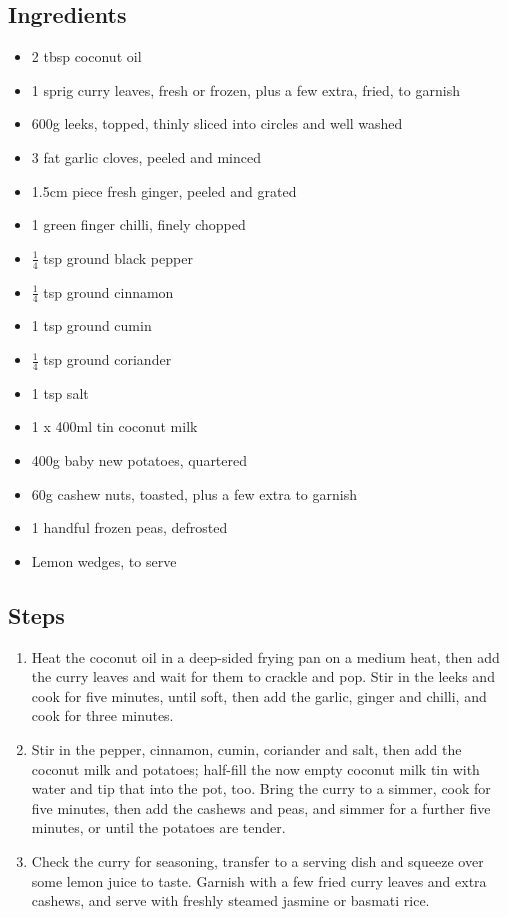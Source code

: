 \documentclass{book}
\begin{document}
\subsection*{Ingredients}
\begin{itemize}
\item 2 tbsp coconut oil
\item 1 sprig curry leaves, fresh or frozen, plus a few extra, fried, to garnish 
\item 600g leeks, topped, thinly sliced into circles and well washed
\item 3 fat garlic cloves, peeled and minced
\item 1.5cm piece fresh ginger, peeled and grated
\item 1 green finger chilli, finely chopped
\item $\frac{1}{4}$ tsp ground black pepper
\item $\frac{1}{4}$ tsp ground cinnamon
\item 1 tsp ground cumin
\item $\frac{1}{4}$ tsp ground coriander
\item 1 tsp salt
\item 1 x 400ml tin coconut milk
\item 400g baby new potatoes, quartered
\item 60g cashew nuts, toasted, plus a few extra to garnish
\item 1 handful frozen peas, defrosted
\item Lemon wedges, to serve
\end{itemize}

\subsection*{Steps}
\begin{enumerate}
\item Heat the coconut oil in a deep-sided frying pan on a medium heat, then add the curry leaves and wait for them to crackle and pop. Stir in the leeks and cook for five minutes, until soft, then add the garlic, ginger and chilli, and cook for three minutes.
\item Stir in the pepper, cinnamon, cumin, coriander and salt, then add the coconut milk and potatoes; half-fill the now empty coconut milk tin with water and tip that into the pot, too. Bring the curry to a simmer, cook for five minutes, then add the cashews and peas, and simmer for a further five minutes, or until the potatoes are tender.
\item Check the curry for seasoning, transfer to a serving dish and squeeze over some lemon juice to taste. Garnish with a few fried curry leaves and extra cashews, and serve with freshly steamed jasmine or basmati rice.
\end{enumerate}
\newpage
\end{document}
